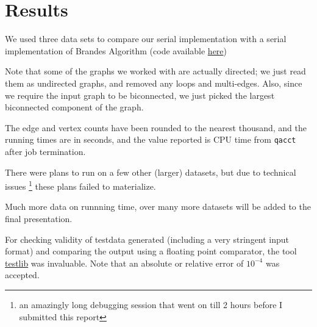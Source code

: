 \chapter{Results}
We used three data sets to compare our serial implementation with a
serial implementation of Brandes Algorithm (code available
\href{https://github.com/parthmittal/graph-algorithms}{here})

Note that some of the graphs we worked with are actually directed;
we just read them as undirected graphs, and removed any loops and multi-edges.
Also, since we require the input graph to be biconnected, we just picked
the largest biconnected component of the graph.

The edge and vertex counts have been rounded to the nearest thousand,
and the running times are in seconds, and the value reported is CPU
time from \verb|qacct| after job termination.

\begin{table}[H]
\end{table}

There were plans to run on a few other (larger) datasets, but due to technical
issues \footnote{an amazingly long debugging session that went on till 2 hours
before I submitted this report}
these plans failed to materialize.

Much more data on runnning time, over many more datasets will be added
to the final presentation.

For checking validity of testdata generated (including a very stringent input
format) and comparing the output using a floating point comparator,
the tool \href{https://github.com/MikeMirzayanov/testlib}{testlib}
was invaluable.
Note that an absolute or relative error of $10^{-4}$ was accepted.

